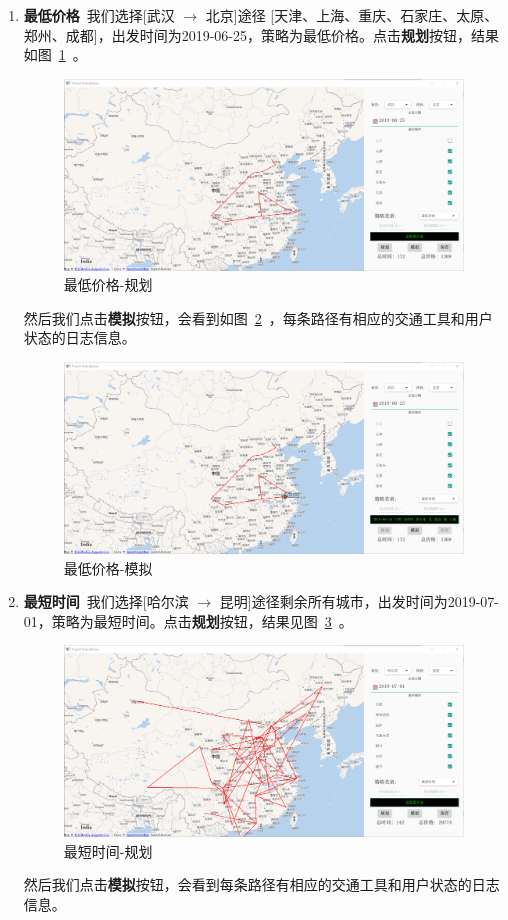 \documentclass[lang=cn,blue,13pt]{elegantbook}
\begin{document}
\begin{enumerate}
	\item \textbf{最低价格}\ 我们选择[武汉 $\to$ 北京]途径 [天津、上海、重庆、石家庄、太原、郑州、成都]，出发时间为2019-06-25，策略为最低价格。点击\textbf{规划}按钮，结果如图~\ref{plan}~。
	
\begin{figure}[!htbp]
	\centering
	\includegraphics[width=.8\textwidth]{plan.png}
	\caption{最低价格-规划}
	\label{plan}
\end{figure}

然后我们点击\textbf{模拟}按钮，会看到如图~\ref{simu}~，每条路径有相应的交通工具和用户状态的日志信息。

\begin{figure}[!htbp]
	\centering
	\includegraphics[width=.8\textwidth]{simulation.png}
	\caption{最低价格-模拟}
	\label{simu}
\end{figure}

	\item \textbf{最短时间}\ 我们选择[哈尔滨 $\to$ 昆明]途径剩余所有城市，出发时间为2019-07-01，策略为最短时间。点击\textbf{规划}按钮，结果见图~\ref{fastest}~。
\begin{figure}[!htbp]
	\centering
	\includegraphics[width=.8\textwidth]{fastest.png}
	\caption{最短时间-规划}
	\label{fastest}
\end{figure}
然后我们点击\textbf{模拟}按钮，会看到每条路径有相应的交通工具和用户状态的日志信息。


\end{enumerate}
\end{document}
